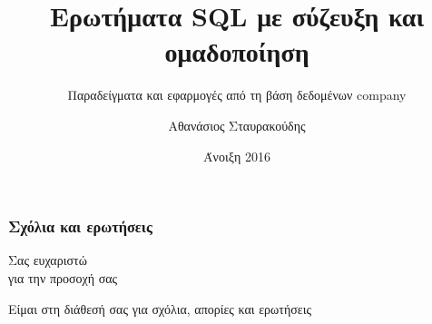 \documentclass[xcolor=dvipsnames, aspectratio=149, 12pt]{beamer}
\begin{document}
\el
\author[]{Αθανάσιος Σταυρακούδης}
\title[]{Ερωτήματα {\en SQL} με σύζευξη και ομαδοποίηση}
\subtitle[]{Παραδείγματα και εφαρμογές από τη βάση δεδομένων {\en company}}
\date[]{Άνοιξη 2016}


\titlepage












\begin{frame}
\frametitle{Σχόλια και ερωτήσεις}
\par {\Huge \color{red} Σας ευχαριστώ \\ για την προσοχή σας }
\vspace{1cm}
\par Είμαι στη διάθεσή σας για σχόλια, απορίες και ερωτήσεις
\end{frame}
\end{document}
